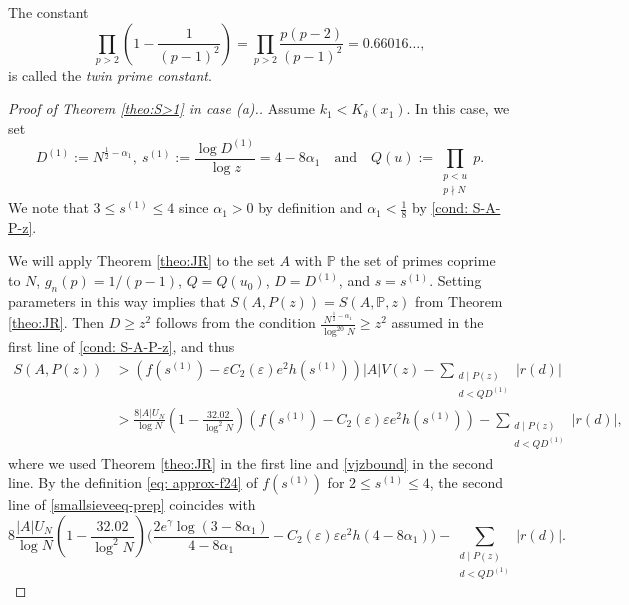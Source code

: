 \documentclass[12pt]{amsart}
\begin{document}
\begin{remark}
    The constant $$\prod_{p>2}\left(1-\frac{1}{(p-1)^2}\right)=\prod_{p>2}\frac{p(p-2)}{(p-1)^2}=0.66016\ldots,$$ is called the {\slshape twin prime constant}.
\end{remark}

\begin{proof}[Proof of Theorem \ref{theo:S>1} in case (a).]
Assume $k_1<K_{\delta}(x_1)$. In this case, we set
\begin{equation} \label{eq: TheoA-def-D-s-Q}
    D^{(1)}:=N^{\frac{1}{2}-\alpha_1},\ s^{(1)}:=\frac{\log D^{(1)}}{\log z}=4-8\alpha_1\quad\text{and}\quad Q(u):=\prod_{\substack{p< u\\p\nmid N}}p.
\end{equation}
We note that $3 \le s^{(1)} \le 4$ since $\alpha_1 > 0$ by definition and $\alpha_1 < \frac{1}{8}$ by \eqref{cond: S-A-P-z}.

We will apply Theorem \ref{theo:JR} to the set $A$ with $\mathbb{P}$ the set of primes coprime to $N$, $g_n(p)=1/(p-1)$, $Q=Q(u_0)$, $D=D^{(1)}$, and $s = s^{(1)}$. Setting parameters in this way implies that $S(A, P(z)) = S(A, \mathbb{P}, z)$ from Theorem \ref{theo:JR}. Then $D\ge z^2$ follows from the condition $\frac{N^{\frac{1}{2}-\alpha_1}}{\log^{20} N}\ge z^2$ assumed in the first line of \eqref{cond: S-A-P-z}, and thus
\begin{align}\label{smallsieveeq-prep}
    S(A,P(z))&>(f(s^{(1)})-\varepsilon C_{2}(\varepsilon) e^2h(s^{(1)}))|A|V(z)- \sum_{\substack{d\mid P(z)\\ d<QD^{(1)}}}|r(d)| \nonumber \\
    &>\frac{8|A|U_N}{\log N}\left(1-\frac{32.02}{\log^2N}\right)(f(s^{(1)})-C_2(\varepsilon)\varepsilon e^2h(s^{(1)}))-\sum_{\substack{d\mid P(z)\\ d<QD^{(1)}}}|r(d)|,
\end{align}
where we used Theorem \ref{theo:JR} in the first line and \eqref{vjzbound} in the second line. By the definition \eqref{eq: approx-f24} of $f(s^{(1)})$ for $2 \le s^{(1)} \le 4$, the second line of \eqref{smallsieveeq-prep} coincides with
\begin{equation} \label{smallsieveeq}
    8\frac{|A| U_N}{\log N}\left(1-\frac{32.02}{\log^2 N}\right)\Bigg(\frac{2e^{\gamma}\log(3-8\alpha_1)}{4-8\alpha_1}-C_2(\varepsilon)\varepsilon e^2h(4-8\alpha_1)\Bigg) -\sum_{\substack{d\mid P(z)\\ d<QD^{(1)}}}|r(d)|.
\end{equation}




\end{proof}
\end{document}
